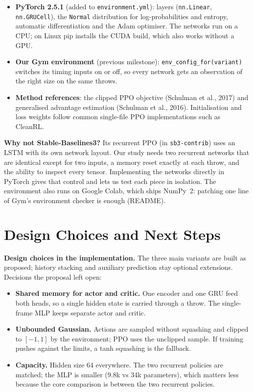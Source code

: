 \documentclass[10pt,a4paper]{article}
\newcommand{\code}[1]{\texttt{#1}}
\begin{document}
\begin{itemize}
  \item \textbf{PyTorch 2.5.1} (added to \code{environment.yml}): layers (\code{nn.Linear},
        \code{nn.GRUCell}), the \code{Normal} distribution for log-probabilities and entropy, automatic
        differentiation and the Adam optimiser. The networks run on a CPU; on Linux pip installs the
        CUDA build, which also works without a GPU.
  \item \textbf{Our Gym environment} (previous milestone): \code{env\_config\_for(variant)} switches its
        timing inputs on or off, so every network gets an observation of the right size on the same throws.
  \item \textbf{Method references}: the clipped PPO objective (Schulman et al., 2017) and generalised
        advantage estimation (Schulman et al., 2016). Initialisation and loss weights follow common
        single-file PPO implementations such as CleanRL.
\end{itemize}
\textbf{Why not Stable-Baselines3?} Its recurrent PPO (in \code{sb3-contrib}) uses an LSTM with its own
network layout. Our study needs two recurrent networks that are identical except for two inputs, a
memory reset exactly at each throw, and the ability to inspect every tensor. Implementing the networks directly in PyTorch gives that control and lets us test each piece in isolation.
The environment also runs on Google Colab, which ships NumPy~2: patching one line of Gym's
environment checker is enough (README).

\section{Design Choices and Next Steps}

\textbf{Design choices in the implementation.} The three main variants are built as proposed; history stacking
and auxiliary prediction stay optional extensions. Decisions the proposal left open:
\begin{itemize}
  \item \textbf{Shared memory for actor and critic.} One encoder and one GRU feed both heads, so a single
        hidden state is carried through a throw. The single-frame MLP keeps separate actor and critic.
  \item \textbf{Unbounded Gaussian.} Actions are sampled without squashing and clipped to $[-1,1]$ by the
        environment; PPO uses the unclipped sample. If training pushes against the limits, a tanh
        squashing is the fallback.
  \item \textbf{Capacity.} Hidden size 64 everywhere. The two recurrent policies are matched; the MLP is
        smaller (9.8k vs 34k parameters), which matters less because the core comparison is between the
        two recurrent policies.
\end{itemize}
\end{document}
